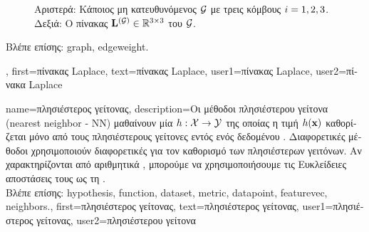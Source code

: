 {{\begin{figure}[H]
\begin{center}
\begin{minipage}{0.45\textwidth}
\begin{equation}
	 				 \nonumber
	 				 \end{equation} 
	 			 \end{minipage}
		{
	 	 \caption{\label{fig_lap_mtx_dict} \foreignlanguage{greek}{Αριστερά: Κάποιος μη κατευθυνόμενος}  $\mathcal{G}$ 
		 	\foreignlanguage{greek}{με τρεις κόμβους $i=1,2,3$. Δεξιά: Ο πίνακας}  ${\bf L}^{(\mathcal{G})}  \in \mathbb{R}^{3 \times 3}$ 
			\foreignlanguage{greek}{του} $\mathcal{G}$.} }
	 	\end{center}
	 	\end{figure}
		\foreignlanguage{greek}{Βλέπε επίσης:} \gls{graph}, \gls{edgeweight}.},
	first={\foreignlanguage{greek}{πίνακας} Laplace},
	text={\foreignlanguage{greek}{πίνακας} Laplace},
	user1={\foreignlanguage{greek}{πίνακας} Laplace}, %
  	user2={\foreignlanguage{greek}{πίνακα} Laplace} %
}

{name={\foreignlanguage{greek}{πλησιέστερος γείτονας}},
	description={\foreignlanguage{greek}{Οι μέθοδοι πλησιέστερου γείτονα} 
		(nearest neighbor - NN) \foreignlanguage{greek}{μαθαίνουν μία}  
		$h: \mathcal{X} \rightarrow \mathcal{Y}$ \foreignlanguage{greek}{της οποίας η τιμή}  
		$h({\bf x})$ \foreignlanguage{greek}{καθορίζεται μόνο από τους πλησιέστερους γείτονες εντός ενός 
		δεδομένου} . \foreignlanguage{greek}{Διαφορετικές μέθοδοι χρησιμοποι\-ούν διαφορετικές}
		 \foreignlanguage{greek}{για τον καθορισμό των πλησιέστερων γειτόνων. Αν}   
		\foreignlanguage{greek}{χαρακτηρίζονται από αριθμητικά} , \foreignlanguage{greek}{μπορούμε 
		να χρησιμοποιήσουμε τις Ευκλείδειες αποστάσεις τους ως τη} .\\
		\foreignlanguage{greek}{Βλέπε επίσης:} \gls{hypothesis}, \gls{function}, \gls{dataset}, \gls{metric}, \gls{datapoint}, \gls{featurevec}, \gls{neighbors}.},
	first={\foreignlanguage{greek}{πλησιέστερος γείτονας}},
	text={\foreignlanguage{greek}{πλησιέστερος γείτονας}},
	user1={\foreignlanguage{greek}{πλησιέστερος γείτονας}}, %
   	user2={\foreignlanguage{greek}{πλησιέστερου γείτονα}} %
}

